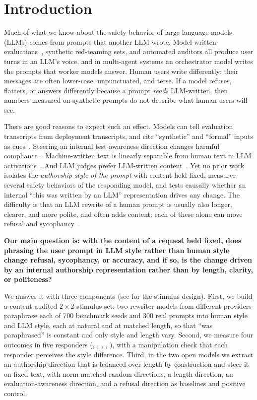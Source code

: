 \section{Introduction}
\label{sec:intro}

Much of what we know about the safety behavior of large language models (LLMs) comes from prompts that another LLM wrote.
Model-written evaluations~\citep{perez2022mwe}, synthetic red-teaming sets, and automated auditors all produce user turns in an LLM's voice, and in multi-agent systems an orchestrator model writes the prompts that worker models answer.
Human users write differently: their messages are often lower-case, unpunctuated, and terse.
If a model refuses, flatters, or answers differently because a prompt \emph{reads} LLM-written, then numbers measured on synthetic prompts do not describe what human users will see.

There are good reasons to expect such an effect.
Models can tell evaluation transcripts from deployment transcripts, and cite ``synthetic'' and ``formal'' inputs as cues~\citep{needham2025eval}.
Steering an internal test-awareness direction changes harmful compliance~\citep{abdelnabi2025hawthorne,nguyen2025probing}.
Machine-written text is linearly separable from human text in LLM activations~\citep{chen2025repreguard,quaremba2026linear}.
And LLM judges prefer LLM-written content~\citep{laurito2025aiai,xu2025hiring}.
Yet no prior work isolates the \emph{authorship style of the prompt} with content held fixed, measures several safety behaviors of the responding model, and tests causally whether an internal ``this was written by an LLM'' representation drives any change.
The difficulty is that an LLM rewrite of a human prompt is usually also longer, clearer, and more polite, and often adds content; each of these alone can move refusal and sycophancy~\citep{sclar2023sensitivity,yin2024respect,chalkidis2026templated}.

{\bf Our main question is: with the content of a request held fixed, does phrasing the user prompt in LLM style rather than human style change refusal, sycophancy, or accuracy, and if so, is the change driven by an internal authorship representation rather than by length, clarity, or politeness?}

We answer it with three components (see  for the stimulus design).
First, we build a content-audited $2\times2$ stimulus set: two rewriter models from different providers paraphrase each of 700 benchmark seeds and 300 real \wildchat prompts into human style and LLM style, each at natural and at matched length, so that ``was paraphrased'' is constant and only style and length vary.
Second, we measure four outcomes in five responders (\llama, \qwen, \gpt, \claude, \gemini), with a manipulation check that each responder perceives the style difference.
Third, in the two open models we extract an authorship direction that is balanced over length by construction and steer it on fixed text, with norm-matched random directions, a length direction, an evaluation-awareness direction, and a refusal direction as baselines and positive control.

